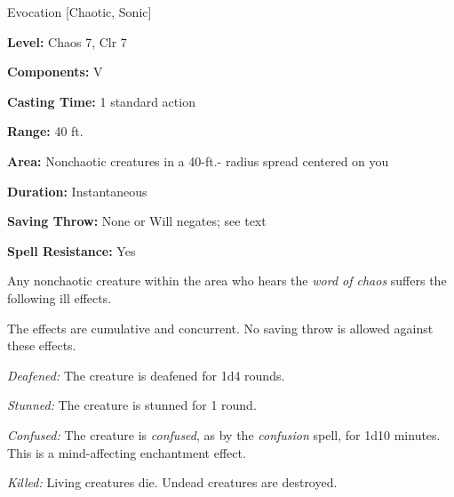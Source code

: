 
Evocation [Chaotic, Sonic]

\textbf{Level:} Chaos 7, Clr 7

\textbf{Components:} V

\textbf{Casting Time:} 1 standard action

\textbf{Range:} 40 ft.

\textbf{Area:} Nonchaotic creatures in a 40-ft.- radius spread centered on you

\textbf{Duration:} Instantaneous

\textbf{Saving Throw:} None or Will negates; see text

\textbf{Spell Resistance:} Yes

Any nonchaotic creature within the area who hears the \textit{word of chaos} suffers 
the following ill effects.

The effects are cumulative and concurrent. No saving throw is allowed against these 
effects.

\textit{Deafened:} The creature is deafened for 1d4 rounds.

\textit{Stunned:} The creature is stunned for 1 round.

\textit{Confused:} The creature is \textit{confused}, as by the \textit{confusion 
}spell, for 1d10 minutes. This is a mind-affecting enchantment effect.

\textit{Killed:} Living creatures die. Undead creatures are destroyed.

